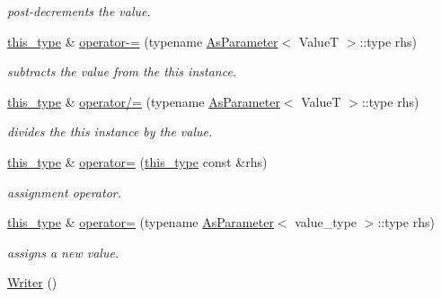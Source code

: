 \begin{DoxyCompactItemize}
\begin{DoxyCompactList}\small\item\em post-\/decrements the value. \end{DoxyCompactList}\item 
\hypertarget{group__atomic__operation_gace0bc7c5e8b6db7afe82e231697672a0}{\hyperlink{classhryky_1_1atomic_1_1_writer_a6b1cad65fb3ef1a993a5eb9e91450aea}{this\-\_\-type} \& \hyperlink{group__atomic__operation_gace0bc7c5e8b6db7afe82e231697672a0}{operator-\/=} (typename \hyperlink{classhryky_1_1_as_parameter}{As\-Parameter}$<$ Value\-T $>$\-::type rhs)}\label{group__atomic__operation_gace0bc7c5e8b6db7afe82e231697672a0}

\begin{DoxyCompactList}\small\item\em subtracts the value from the this instance. \end{DoxyCompactList}\item 
\hypertarget{group__atomic__operation_ga1f4841e2995310212eb4762cd3717e6b}{\hyperlink{classhryky_1_1atomic_1_1_writer_a6b1cad65fb3ef1a993a5eb9e91450aea}{this\-\_\-type} \& \hyperlink{group__atomic__operation_ga1f4841e2995310212eb4762cd3717e6b}{operator/=} (typename \hyperlink{classhryky_1_1_as_parameter}{As\-Parameter}$<$ Value\-T $>$\-::type rhs)}\label{group__atomic__operation_ga1f4841e2995310212eb4762cd3717e6b}

\begin{DoxyCompactList}\small\item\em divides the this instance by the value. \end{DoxyCompactList}\item 
\hyperlink{classhryky_1_1atomic_1_1_writer_a6b1cad65fb3ef1a993a5eb9e91450aea}{this\-\_\-type} \& \hyperlink{group__atomic__operation_gab5e4c7b8fa6d6c4e791f7f8f651de97f}{operator=} (\hyperlink{classhryky_1_1atomic_1_1_writer_a6b1cad65fb3ef1a993a5eb9e91450aea}{this\-\_\-type} const \&rhs)
\begin{DoxyCompactList}\small\item\em assignment operator. \end{DoxyCompactList}\item 
\hyperlink{classhryky_1_1atomic_1_1_writer_a6b1cad65fb3ef1a993a5eb9e91450aea}{this\-\_\-type} \& \hyperlink{group__atomic__operation_gabe02d1a1584c488c8b71e49ff212235e}{operator=} (typename \hyperlink{classhryky_1_1_as_parameter}{As\-Parameter}$<$ value\-\_\-type $>$\-::type rhs)
\begin{DoxyCompactList}\small\item\em assigns a new value. \end{DoxyCompactList}\item 
\hypertarget{classhryky_1_1atomic_1_1_writer_a7fd174cd5efde82187ab66bf00bd742a}{\hyperlink{classhryky_1_1atomic_1_1_writer_a7fd174cd5efde82187ab66bf00bd742a}{Writer} ()}\label{classhryky_1_1atomic_1_1_writer_a7fd174cd5efde82187ab66bf00bd742a}


\end{DoxyCompactItemize}
